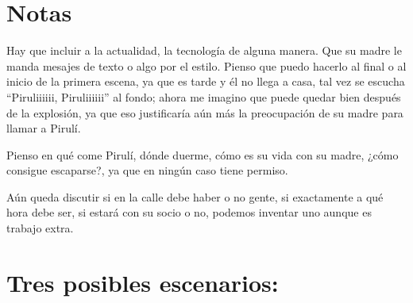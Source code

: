 \documentclass[12pt, a4paper]{article}
\begin{document}
  \section*{Notas}
  Hay que incluir a la actualidad, la tecnología de alguna manera. Que su madre le manda mesajes de texto o algo por el estilo. Pienso que 
  puedo hacerlo al final o al inicio de la primera escena, ya que es tarde y él no llega a casa, tal vez se escucha ``Piruliiiiii, Piruliiiiii''
  al fondo; ahora me imagino que puede quedar bien después de la explosión, ya que eso justificaría aún más la preocupación de su madre 
  para llamar a Pirulí.

  Pienso en qué come Pirulí, dónde duerme, cómo es su vida con su madre, ¿cómo consigue escaparse?, ya que en ningún caso tiene permiso.

  Aún queda discutir si en la calle debe haber o no gente, si exactamente a qué hora debe ser, si estará con su socio o no, podemos inventar
  uno aunque es trabajo extra.

  \section*{Tres posibles escenarios:}

  
\end{document}
